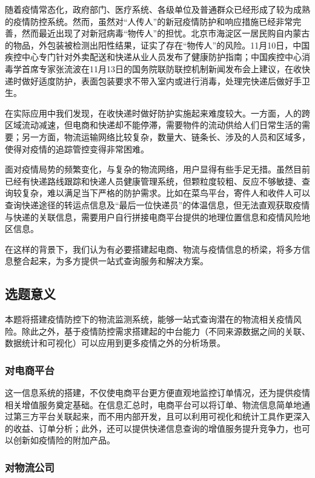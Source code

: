 \documentclass[12pt]{article}
\begin{document}
随着疫情常态化，政府部门、医疗系统、各级单位及普通群众已经形成了较为成熟的疫情防控系统。然而，虽然对“人传人”的新冠疫情防护和响应措施已经非常完善，然而最近出现了对新冠病毒“物传人”的担忧。北京市海淀区一居民购自内蒙古的物品，外包装被检测出阳性结果，证实了存在“物传人”的风险。11月10日，中国疾控中心专门针对外卖配送和快递从业人员发布了健康防护指南；中国疾控中心消毒学首席专家张流波在11月13日的国务院联防联控机制新闻发布会上建议，在收快递时做好适度防护，表面包装要求不带入室内或进行消毒，处理完快递后做好手卫生。\par 
在实际应用中我们发现，在收快递时做好防护实施起来难度较大。一方面，人的跨区域流动减速，但电商和快递却不能停滞，需要物件的流动供给人们日常生活的需要；另一方面，物流运输网络比较复杂，数量大、链条长、涉及的人员和区域多，使得对疫情的追踪管控变得非常困难。\par 
面对疫情局势的频繁变化，与复杂的物流网络，用户显得有些手足无措。虽然目前已经有快递路线跟踪和快递人员健康管理系统，但颗粒度较粗、反应不够敏捷、查询较复杂，难以满足当下严格的防护需求。比如在菜鸟平台，寄件人和收件人可以查询快递途径的转运点信息及“最后一位快递员”的体温信息，但无法直观获取疫情与快递的关联信息，需要用户自行拼接电商平台提供的地理位置信息和疫情风险地区信息。\par 
在这样的背景下，我们认为有必要搭建起电商、物流与疫情信息的桥梁，将多方信息整合起来，为多方提供一站式查询服务和解决方案。

\subsection{选题意义}

本题将搭建疫情防控下的物流监测系统，能够一站式查询潜在的物流相关疫情风险。除此之外，基于疫情防控需求搭建起的中台能力（不同来源数据之间的关联、数据统计和可视化）可以应用到更多疫情之外的分析场景。

\subsubsection{对电商平台}

这一信息系统的搭建，不仅使电商平台更方便直观地监控订单情况，还为提供疫情相关增值服务奠定基础。在信息汇总时，电商平台可以将订单、物流信息简单地通过第三方平台关联起来，而不用内部开发，且可以利用可视化和统计工具作更深入的收益、订单分析；此外，还可以提供快递信息查询的增值服务提升竞争力，也可以创新如疫情险的附加产品。

\subsubsection{对物流公司}
\end{document}
